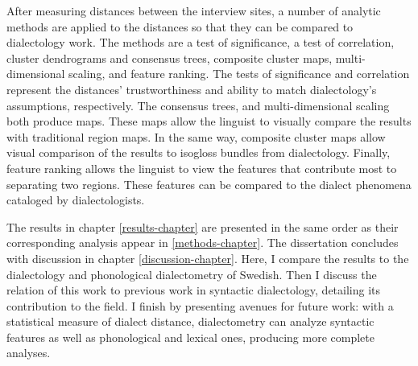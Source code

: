 After measuring distances between the interview sites, a number of
analytic methods are applied to the distances so that they can be
compared to dialectology work. The methods are a test of significance,
a test of correlation, cluster dendrograms and consensus trees,
composite cluster maps, multi-dimensional scaling, and feature
ranking. The tests of significance and correlation represent the
distances' trustworthiness and ability to match dialectology's
assumptions, respectively. The consensus trees, and multi-dimensional
scaling both produce maps. These maps allow the linguist to visually
compare the results with traditional region maps. In the same way,
composite cluster maps allow visual comparison of the results to
isogloss bundles from dialectology. Finally, feature ranking allows
the linguist to view the features that contribute most to separating
two regions. These features can be compared to the dialect phenomena cataloged
by dialectologists.

The results in chapter \ref{results-chapter} are presented in the same
order as their corresponding analysis appear in \ref{methods-chapter}.
The dissertation concludes with discussion in chapter
\ref{discussion-chapter}. Here, I compare the results to the dialectology
and phonological dialectometry of Swedish. Then I discuss the relation
of this work to previous work in syntactic dialectology, detailing its
contribution to the field. I finish by presenting avenues for future
work: with a statistical measure of dialect distance, dialectometry
can analyze syntactic features as well as phonological and lexical
ones, producing more complete analyses.

